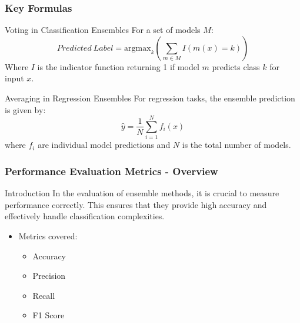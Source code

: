\documentclass[aspectratio=169]{beamer}
\begin{document}
\begin{frame}[fragile]
  \frametitle{Key Formulas}
  \begin{block}{Voting in Classification Ensembles}
    For a set of models \(M\):
    \[
    Predicted\ Label = \text{argmax}_k \left(\sum_{m \in M} I(m(x) = k)\right)
    \]
    Where \(I\) is the indicator function returning 1 if model \(m\) predicts class \(k\) for input \(x\).
  \end{block}

  \begin{block}{Averaging in Regression Ensembles}
    For regression tasks, the ensemble prediction is given by:
    \[
    \hat{y} = \frac{1}{N} \sum_{i=1}^{N} f_i(x)
    \]
    where \(f_i\) are individual model predictions and \(N\) is the total number of models.
  \end{block}
\end{frame}

\begin{frame}[fragile]
    \frametitle{Performance Evaluation Metrics - Overview}
    \begin{block}{Introduction}
        In the evaluation of ensemble methods, it is crucial to measure performance correctly. This ensures that they provide high accuracy and effectively handle classification complexities. 
        \end{block}
    \begin{itemize}
        \item Metrics covered:
        \begin{itemize}
            \item Accuracy
            \item Precision
            \item Recall
            \item F1 Score
        \end{itemize}
    \end{itemize}
\end{frame}
\end{document}
